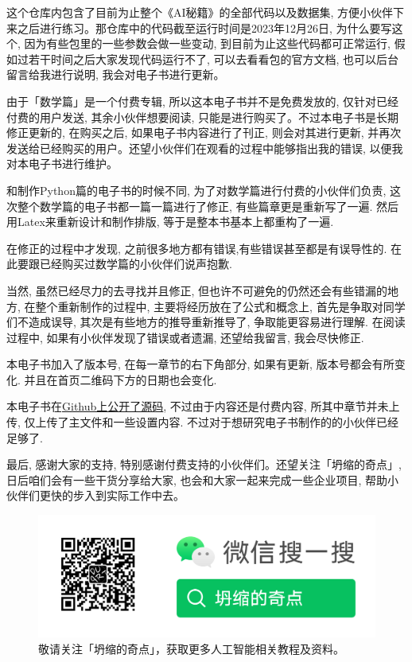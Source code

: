 这个仓库内包含了目前为止整个《AI秘籍》的全部代码以及数据集, 方便小伙伴下来之后进行练习。那仓库中的代码截至运行时间是2023年12月26日, 为什么要写这个, 因为有些包里的一些参数会做一些变动, 到目前为止这些代码都可正常运行, 假如过若干时间之后大家发现代码运行不了, 可以去看看包的官方文档, 也可以后台留言给我进行说明, 我会对电子书进行更新。

由于「数学篇」是一个付费专辑, 所以这本电子书并不是免费发放的, 仅针对已经付费的用户发送, 其余小伙伴想要阅读, 只能是进行购买了。不过本电子书是长期修正更新的, 在购买之后, 如果电子书内容进行了刊正, 则会对其进行更新, 并再次发送给已经购买的用户。还望小伙伴们在观看的过程中能够指出我的错误, 以便我对本电子书进行维护。

和制作Python篇的电子书的时候不同, 为了对数学篇进行付费的小伙伴们负责, 这次整个数学篇的电子书都一篇一篇进行了修正, 有些篇章更是重新写了一遍. 然后用Latex来重新设计和制作排版, 等于是整本书基本上都重构了一遍.

在修正的过程中才发现, 之前很多地方都有错误,有些错误甚至都是有误导性的. 在此要跟已经购买过数学篇的小伙伴们说声抱歉. 

当然, 虽然已经尽力的去寻找并且修正, 但也许不可避免的仍然还会有些错漏的地方, 在整个重新制作的过程中, 主要将经历放在了公式和概念上, 首先是争取对同学们不造成误导, 其次是有些地方的推导重新推导了, 争取能更容易进行理解. 在阅读过程中, 如果有小伙伴发现了错误或者遗漏, 还望给我留言, 我会尽快修正.

本电子书加入了版本号, 在每一章节的右下角部分, 如果有更新, 版本号都会有所变化. 并且在首页二维码下方的日期也会变化.

本电子书在\href{https://github.com/hivandu/Ebook_AI_Math}{Github上公开了源码}, 不过由于内容还是付费内容, 所其中章节并未上传, 仅上传了主文件和一些设置内容. 不过对于想研究电子书制作的的小伙伴已经足够了.

最后, 感谢大家的支持, 特别感谢付费支持的小伙伴们。还望关注「坍缩的奇点」, 日后咱们会有一些干货分享给大家, 也会和大家一起来完成一些企业项目, 帮助小伙伴们更快的步入到实际工作中去。

\begin{figure}[ht]
  \centering
  \includegraphics[width=0.6\linewidth]{asset/Capture-2023-11-02-164446.png}
  \caption{敬请关注「坍缩的奇点」，获取更多人工智能相关教程及资料。}
  \label{fig:img1_1}
\end{figure}